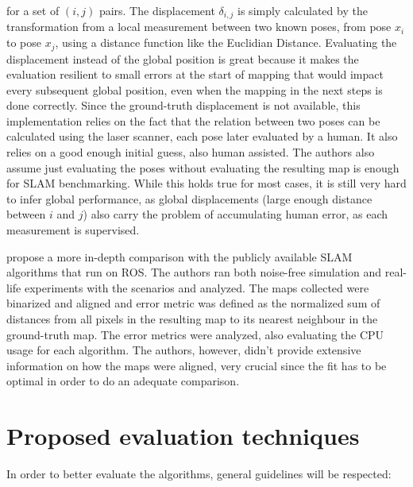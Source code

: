  \noindent for a set of  $(i,j)$ pairs. The displacement $\delta_{i, j}$ is simply calculated by the transformation from a local measurement between two known poses, from pose $x_i$ to pose $x_j$, using a distance function like the Euclidian Distance. Evaluating the displacement instead of the global position is great because it makes the evaluation resilient to small errors at the start of mapping that would impact every subsequent global position, even when the mapping in the next steps is done correctly. Since the ground-truth displacement is not available, this implementation relies on the fact that the relation between two poses can be calculated using the laser scanner, each pose later evaluated by a human. It also relies on a good enough initial guess, also human assisted. The authors also assume just evaluating the poses without evaluating the resulting map is enough for SLAM benchmarking. While this holds true for most cases, it is still very hard to infer global performance, as global displacements (large enough distance between $i$ and $j$) also carry the problem of accumulating human error, as each measurement is supervised.
 
 \citeauthor{santos2013evaluation} propose a more in-depth comparison with the publicly available SLAM algorithms that run on ROS. The authors ran both noise-free simulation and real-life experiments with the scenarios and analyzed. The maps collected were binarized and aligned and error metric was defined as the normalized sum of distances from all pixels in the resulting map to its nearest neighbour in the ground-truth map. The error metrics were analyzed, also evaluating the CPU usage for each algorithm. The authors, however, didn't provide extensive information on how the maps were aligned, very crucial since the fit has to be optimal in order to do an adequate comparison.
 
 \section{Proposed evaluation techniques} \label{sec:proposed-evaluation}
 
 In order to better evaluate the algorithms, general guidelines will be respected:
 

